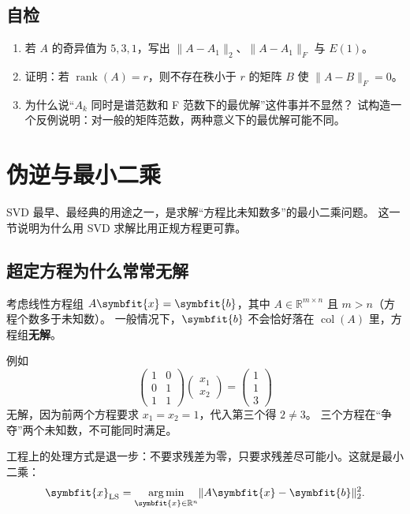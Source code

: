 \documentclass[UTF8, 11pt, a4paper, fontset=windows]{ctexart}
\theoremstyle{cnthm}
\theoremstyle{cndef}
\newcommand{\R}{\mathbb{R}}
\newcommand{\nrm}[1]{\lVert #1 \rVert}
\DeclareMathOperator{\rank}{rank}
\DeclareMathOperator{\Col}{col}
\DeclareMathOperator*{\argmin}{arg\,min}
\newcommand{\x}{\symbfit{x}}
\newcommand{\bb}{\symbfit{b}}
\begin{document}
\subsection*{自检}
\begin{enumerate}
  \item 若 $A$ 的奇异值为 $5,3,1$，写出 $\nrm{A-A_1}_2$、$\nrm{A-A_1}_F$ 与 $E(1)$。
  \item 证明：若 $\rank(A)=r$，则不存在秩小于 $r$ 的矩阵 $B$ 使 $\nrm{A-B}_F=0$。
  \item 为什么说“$A_k$ 同时是谱范数和 F 范数下的最优解”这件事并不显然？
        试构造一个反例说明：对一般的矩阵范数，两种意义下的最优解可能不同。
\end{enumerate}

\section{伪逆与最小二乘}\label{sec:pinv}

SVD 最早、最经典的用途之一，是求解“方程比未知数多”的最小二乘问题。
这一节说明为什么用 SVD 求解比用正规方程更可靠。

\subsection{超定方程为什么常常无解}

考虑线性方程组 $A\x=\bb$，其中 $A\in\R^{m\times n}$ 且 $m>n$（方程个数多于未知数）。
一般情况下，$\bb$ 不会恰好落在 $\Col(A)$ 里，方程组\textbf{无解}。

例如
\begin{equation}
  \begin{pmatrix}1&0\\0&1\\1&1\end{pmatrix}\begin{pmatrix}x_1\\x_2\end{pmatrix}
  =\begin{pmatrix}1\\1\\3\end{pmatrix}
\end{equation}
无解，因为前两个方程要求 $x_1=x_2=1$，代入第三个得 $2\neq3$。
三个方程在“争夺”两个未知数，不可能同时满足。

工程上的处理方式是退一步：不要求残差为零，只要求残差尽可能小。这就是最小二乘：
\begin{equation}\label{eq:ls}
  \x_{\mathrm{LS}}=\argmin_{\x\in\R^{n}}\nrm{A\x-\bb}_2^2 .
\end{equation}
\end{document}
